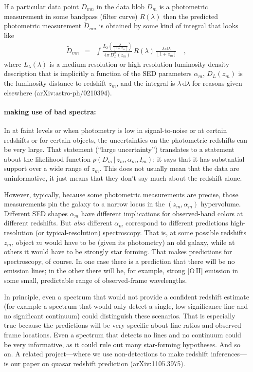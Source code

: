 \documentclass[12pt]{article}
\newcommand{\given}{\,|\,}
\newcommand{\dd}{\mathrm d}
\begin{document}
If a particular data point $D_{mn}$ in the data blob $D_m$ is a
photometric measurement in some bandpass (filter curve) $R(\lambda)$
then the predicted photometric measurement $\tilde{D}_{mn}$ is
obtained by some kind of integral that looks like
\begin{eqnarray}\displaystyle
\tilde{D}_{mn} &=& \int \frac{L_{\lambda}(\frac{\lambda}{[1+z_m]})}{4\pi\,D_L^2(z_m)}\,R(\lambda)\,\frac{\lambda\,\dd\lambda}{[1+z_m]}
\quad ,
\end{eqnarray}
where $L_{\lambda}(\lambda)$ is a medium-resolution or high-resolution
luminosity density description that is implicitly a function of the
SED parameters $\alpha_m$, $D_L(z_m)$ is the luminosity distance to
redshift $z_m$, and the integral is $\lambda\,\dd\lambda$ for reasons
given elsewhere (arXiv:astro-ph/0210394).

\paragraph{making use of bad spectra:}
In at faint levels or when photometry is low in signal-to-noise or at
certain redshifts or for certain objects, the uncertainties on the
photometric redshifts can be very large.  That statement (``large
uncertainty'') translates to a statement about the likelihood function
$p(D_m \given z_m, \alpha_m, I_m)$; it says that it has substantial
support over a wide range of $z_m$.  This does not usually mean that
the data are uninformative, it just means that they don't say much
about the redshift alone.

However, typically, because some photometric measurements are precise,
those measurements pin the galaxy to a narrow locus in the
$(z_m,\alpha_m)$ hypervolume.  Different SED shapes $\alpha_m$ have
different implications for observed-band colors at different
redshifts.  But \emph{also} different $\alpha_m$ correspond to
different predictions high-resolution (or typical-resolution)
spectroscopy.  That is, at some possible redshifts $z_m$, object $m$
would have to be (given its photometry) an old galaxy, while at others
it would have to be strongly star forming.  That makes predictions for
spectroscopy, of course.  In one case there is a prediction that there
will be no emission lines; in the other there will be, for example,
strong [O\,II] emission in some small, predictable range of
observed-frame wavelengths.

In principle, even a spectrum that would not provide a confident
redshift estimate (for example a spectrum that would only detect a
single, low significance line and no significant continuum) could
distinguish these scenarios.  That is especially true because the
predictions will be very specific about line ratios and observed-frame
locations.  Even a spectrum that detects no lines and no continuum
could be very informative, as it could rule out many star-forming
hypotheses.  And so on.  A related project---where we use
non-detections to make redshift inferences---is our paper on quasar
redshift prediction (arXiv:1105.3975).
\end{document}
